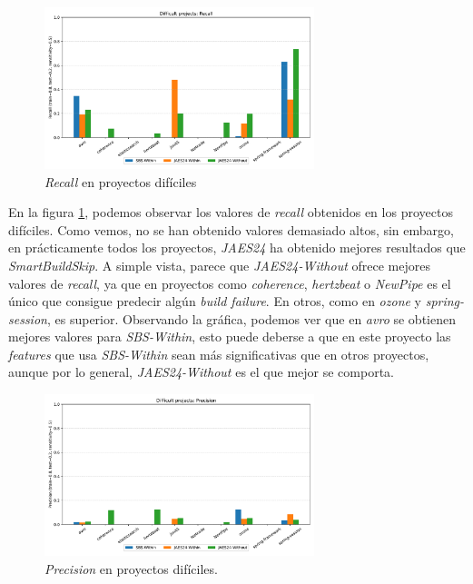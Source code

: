 \begin{figure}[H]
    \centering
    \includegraphics[width=0.7\textwidth]{images/Difficult projects: Recall.pdf}
    \caption{\textit{Recall} en proyectos difíciles}
    \label{fig:train_test_recall_difficult_projects}
\end{figure}

En la figura \ref{fig:train_test_recall_difficult_projects}, podemos observar los valores de
\textit{recall} obtenidos en los proyectos difíciles. Como vemos, no se han obtenido valores
demasiado altos, sin embargo, en prácticamente todos los proyectos, \textit{JAES24} ha obtenido
mejores resultados que \textit{SmartBuildSkip}. A simple vista, parece que \textit{JAES24-Without}
ofrece mejores valores de \textit{recall}, ya que en proyectos como \textit{coherence},
\textit{hertzbeat} o \textit{NewPipe} es el único que consigue predecir algún \textit{build
failure}. En otros, como en \textit{ozone} y \textit{spring-session}, es superior. Observando
la gráfica, podemos ver que en \textit{avro} se obtienen mejores valores para \textit{SBS-Within},
esto puede deberse a que en este proyecto las \textit{features} que usa \textit{SBS-Within} 
sean más significativas que en otros proyectos, aunque por lo general, \textit{JAES24-Without}
es el que mejor se comporta.\\

\begin{figure}[H]
    \centering
    \includegraphics[width=0.7\textwidth]{images/Difficult projects: Precision.pdf}
    \caption{\textit{Precision} en proyectos difíciles.}
    \label{fig:train_test_precision_difficult_projects}
\end{figure}

